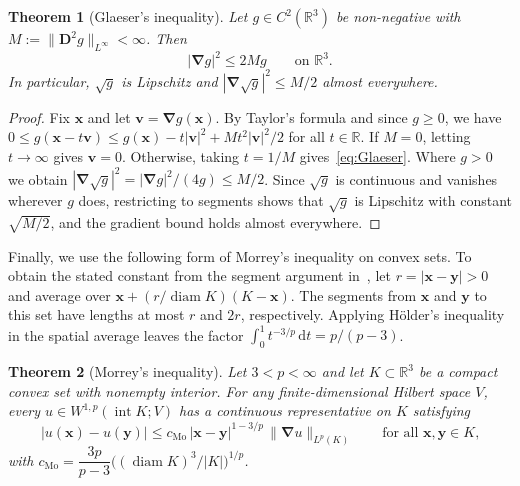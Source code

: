 \documentclass[final,reqno]{amsart}
\newtheorem{theorem}{Theorem}[section]
\theoremstyle{remark}
\renewcommand{\le}{\leqslant}
\renewcommand{\ge}{\geqslant}
\DeclareMathOperator{\diam}{diam}
\DeclareMathOperator{\Int}{int}
\newcommand{\RR}{\mathbb{R}}
\newcommand{\grad}{\bm{\nabla}}
\newcommand{\dd}{\mathrm{d}}
\begin{document}
\begin{theorem}[Glaeser's inequality]\label{thm:Glaeser}
Let $g\in C^2(\RR^3)$ be non-negative with $M:=\|\mathbf{D}^2g\|_{L^\infty}<\infty$. Then
\begin{equation}\label{eq:Glaeser}
|\grad g|^2\le2Mg\qquad\text{on $\RR^3$.}
\end{equation}
In particular, $\sqrt{g}$ is Lipschitz and $|\grad\sqrt{g}|^2\le M/2$ almost everywhere.
\end{theorem}

\begin{proof}
Fix $\mathbf{x}$ and let $\mathbf{v}=\grad g(\mathbf{x})$. By Taylor's formula and since $g\ge0$, we have $0\le g(\mathbf{x}-t\mathbf{v})\le g(\mathbf{x})-t|\mathbf{v}|^2+Mt^2|\mathbf{v}|^2/2$ for all $t\in\RR$. If $M=0$, letting $t\to\infty$ gives $\mathbf{v}=0$. Otherwise, taking $t=1/M$ gives~\cref{eq:Glaeser}. Where $g>0$ we obtain $|\grad\sqrt{g}|^2=|\grad g|^2/(4g)\le M/2$. Since $\sqrt{g}$ is continuous and vanishes wherever $g$ does, restricting to segments shows that $\sqrt{g}$ is Lipschitz with constant $\sqrt{M/2}$, and the gradient bound holds almost everywhere.
\end{proof}

Finally, we use the following form of Morrey's inequality on convex sets. To obtain the stated constant from the segment argument in~\cite[Lemma~7.16]{gilbarg2001elliptic}, let $r=|\mathbf{x}-\mathbf{y}|>0$ and average over $\mathbf{x}+(r/\diam K)(K-\mathbf{x})$. The segments from $\mathbf{x}$ and $\mathbf{y}$ to this set have lengths at most $r$ and $2r$, respectively. Applying H\"older's inequality in the spatial average leaves the factor $\int_0^1 t^{-3/p}\,\dd t=p/(p-3)$.

\begin{theorem}[Morrey's inequality]\label{thm:Morrey}
Let $3<p<\infty$ and let $K\subset\RR^3$ be a compact convex set with nonempty interior. For any finite-dimensional Hilbert space $V$, every $u\in W^{1,p}(\Int K;V)$ has a continuous representative on $K$ satisfying
\begin{equation}\label{eq:Morrey}
|u(\mathbf{x})-u(\mathbf{y})|\le c_{\mathrm{Mo}}\,|\mathbf{x}-\mathbf{y}|^{1-3/p}\,\|\grad u\|_{L^p(K)}\qquad\text{for all $\mathbf{x},\mathbf{y}\in K$,}
\end{equation}
with $c_{\mathrm{Mo}}=\dfrac{3p}{p-3}\big((\diam K)^3/|K|\big)^{1/p}$.
\end{theorem}
\end{document}
